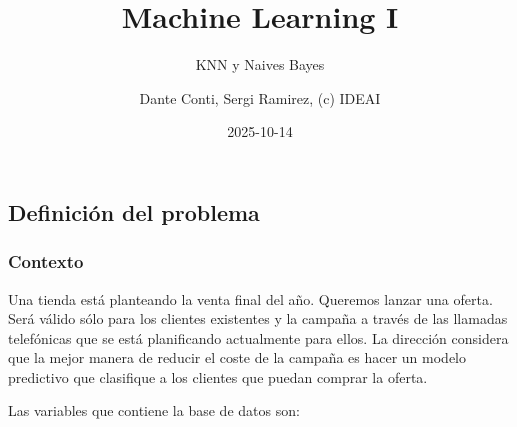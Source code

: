 \documentclass[
  letterpaper,
  DIV=11,
  numbers=noendperiod]{scrartcl}
\title{Machine Learning I}
\subtitle{KNN y Naives Bayes}
\author{Dante Conti, Sergi Ramirez, (c) IDEAI}
\date{2025-10-14}
\renewcommand*\contentsname{Table of contents}
\newcommand\contentsname{Table of contents}
\begin{document}
\maketitle

\renewcommand*\contentsname{Table of contents}
{
\hypersetup{linkcolor=}
\setcounter{tocdepth}{3}
\tableofcontents
}

\subsection{Definición del problema}\label{definiciuxf3n-del-problema}

\subsubsection{Contexto}\label{contexto}

Una tienda está planteando la venta final del año. Queremos lanzar una
oferta. Será válido sólo para los clientes existentes y la campaña a
través de las llamadas telefónicas que se está planificando actualmente
para ellos. La dirección considera que la mejor manera de reducir el
coste de la campaña es hacer un modelo predictivo que clasifique a los
clientes que puedan comprar la oferta.

Las variables que contiene la base de datos son:
\end{document}
